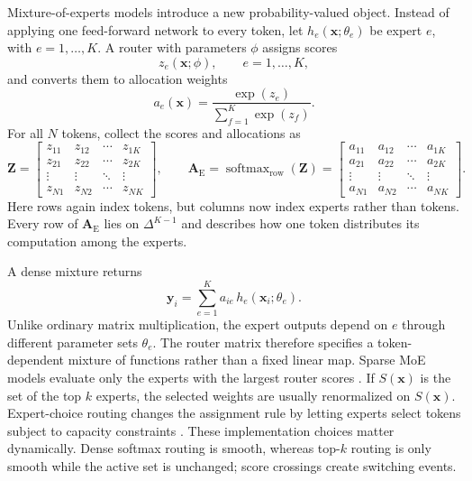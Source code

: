 \documentclass[11pt]{article}
\begin{document}
Mixture-of-experts models introduce a new probability-valued object. Instead of applying one feed-forward network to every token, let $h_e(\mathbf x;\theta_e)$ be expert $e$, with $e=1,\ldots,K$. A router with parameters $\phi$ assigns scores
\begin{equation}
z_e(\mathbf x;\phi),
\qquad
e=1,\ldots,K,
\end{equation}
and converts them to allocation weights
\begin{equation}
a_e(\mathbf x)
=
\frac{\exp(z_e)}{\sum_{f=1}^{K}\exp(z_f)}.
\label{eq:router-softmax}
\end{equation}
For all $N$ tokens, collect the scores and allocations as
\begin{equation}
\mathbf Z
=
\begin{bmatrix}
z_{11} & z_{12} & \cdots & z_{1K}\\
z_{21} & z_{22} & \cdots & z_{2K}\\
\vdots & \vdots & \ddots & \vdots\\
z_{N1} & z_{N2} & \cdots & z_{NK}
\end{bmatrix},
\qquad
\mathbf A_{\mathrm{E}}
=
\operatorname{softmax}_{\mathrm{row}}(\mathbf Z)
=
\begin{bmatrix}
a_{11} & a_{12} & \cdots & a_{1K}\\
a_{21} & a_{22} & \cdots & a_{2K}\\
\vdots & \vdots & \ddots & \vdots\\
a_{N1} & a_{N2} & \cdots & a_{NK}
\end{bmatrix}.
\label{eq:router-matrix}
\end{equation}
Here rows again index tokens, but columns now index experts rather than tokens. Every row of $\mathbf A_{\mathrm E}$ lies on $\Delta^{K-1}$ and describes how one token distributes its computation among the experts.

A dense mixture returns
\begin{equation}
\mathbf y_i
=
\sum_{e=1}^{K}
a_{ie}\,
h_e(\mathbf x_i;\theta_e).
\label{eq:dense-moe}
\end{equation}
Unlike ordinary matrix multiplication, the expert outputs depend on $e$ through different parameter sets $\theta_e$. The router matrix therefore specifies a token-dependent mixture of functions rather than a fixed linear map.
Sparse MoE models evaluate only the experts with the largest router scores \cite{shazeer2017,fedus2022}. If $S(\mathbf x)$ is the set of the top $k$ experts, the selected weights are usually renormalized on $S(\mathbf x)$. Expert-choice routing changes the assignment rule by letting experts select tokens subject to capacity constraints \cite{zhou2022}. These implementation choices matter dynamically. Dense softmax routing is smooth, whereas top-$k$ routing is only smooth while the active set is unchanged; score crossings create switching events.
\end{document}
